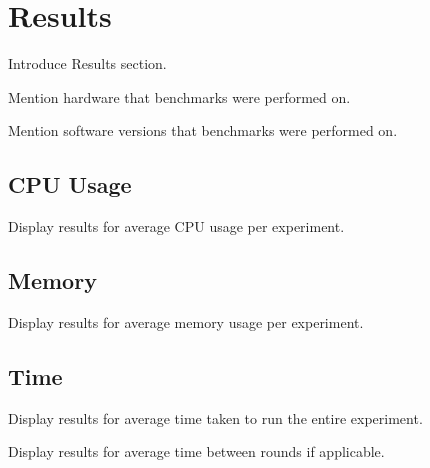 \section{Results}

Introduce Results section.

Mention hardware that benchmarks were performed on.

Mention software versions that benchmarks were performed on.

\subsection{CPU Usage}

Display results for average CPU usage per experiment.

\subsection{Memory}

Display results for average memory usage per experiment.

\subsection{Time}

Display results for average time taken to run the entire experiment.

Display results for average time between rounds if applicable.


